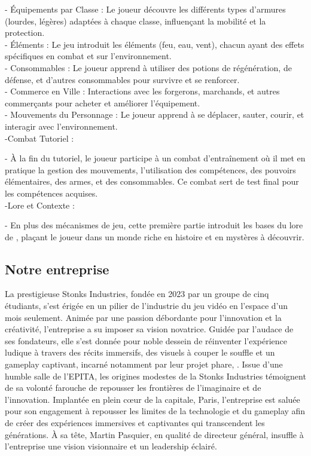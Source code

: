 - Équipements par Classe : Le joueur découvre les différents types d'armures (lourdes, légères) adaptées à chaque classe, influençant la mobilité et la protection.
\\

- Éléments : Le jeu introduit les éléments (feu, eau, vent), chacun ayant des effets spécifiques en combat et sur l'environnement.
\\

- Consommables : Le joueur apprend à utiliser des potions de régénération, de défense, et d'autres consommables pour survivre et se renforcer.
\\

- Commerce en Ville : Interactions avec les forgerons, marchands, et autres commerçants pour acheter et améliorer l'équipement.
\\

-  Mouvements du Personnage : Le joueur apprend à se déplacer, sauter, courir, et interagir avec l'environnement.
\\

-Combat Tutoriel :

- À la fin du tutoriel, le joueur participe à un combat d'entraînement où il met en pratique la gestion des mouvements, l'utilisation des compétences, des pouvoirs élémentaires, des armes, et des consommables.
Ce combat sert de test final pour les compétences acquises.
\\

-Lore et Contexte :

- En plus des mécanismes de jeu, cette première partie introduit les bases du lore de \gameName, plaçant le joueur dans un monde riche en histoire et en mystères à découvrir.



\subsection{Notre entreprise}

La prestigieuse Stonks Industries, fondée en 2023 par un groupe de cinq étudiants, s'est érigée en un pilier de l'industrie du jeu vidéo en l'espace d'un mois seulement.
Animée par une passion débordante pour l'innovation et la créativité, l'entreprise a su imposer sa vision novatrice. Guidée par l'audace de ses fondateurs, elle s'est donnée
pour noble dessein de réinventer l'expérience ludique à travers des récits immersifs, des visuels à couper le souffle et un gameplay captivant, incarné notamment par leur
projet phare, \gameName. Issue d'une humble salle de l'EPITA, les origines modestes de la Stonks Industries témoignent de sa volonté farouche de repousser les frontières de
l'imaginaire et de l'innovation.
Implantée en plein cœur de la capitale, Paris, l'entreprise est saluée pour son engagement à repousser les limites de la technologie et du gameplay afin de créer des
expériences immersives et captivantes qui transcendent les générations. À sa tête, Martin Pasquier, en qualité de directeur général, insuffle à l'entreprise une vision
visionnaire et un leadership éclairé.

